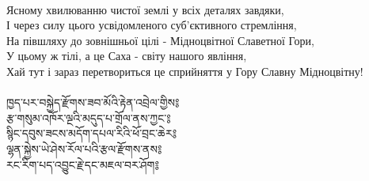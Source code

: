 \\
\ru
Ясному хвилюванню чистої землі у всіх деталях завдяки,\\
І через силу цього усвідомленого суб'єктивного стремління, \\
На півшляху до зовнішньої цілі - Мідноцвітної Славетної Гори,\\
У цьому ж тілі, а це Саха - світу нашого явління,\\
Хай тут і зараз перетвориться це сприйняття у Гору Славну Мідноцвітну!\\
\\
{\ti ཁྱད་པར་བསྐྱེད་རྫོགས་ཟབ་མོའི་རྟེན་འབྲེལ་གྱིས༔\\
རྩ་གསུམ་འཁོར་ལྔའི་མདུད་པ་གྲོལ་ནས་ཀྱང་༔\\
སྙིང་དབུས་ཟངས་མདོག་དཔལ་རིའི་ཕོ་བྲང་ཆེར༔\\
ལྷན་སྐྱེས་ཡེ་ཤེས་རོལ་པའི་རྩལ་རྫོགས་ནས༔\\
རང་རིག་པད་འབྱུང་རྗེ་དང་མཇལ་བར་ཤོག༔}\\
\\
